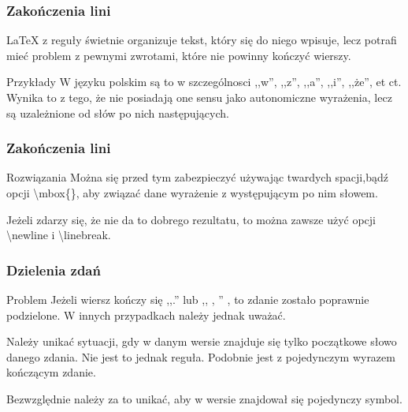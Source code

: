 \documentclass{beamer}
\begin{document}
\begin{frame}
\frametitle{Zakończenia lini}


\begin{block}{}
\LaTeX{ } z reguły świetnie organizuje tekst, który się do niego wpisuje, lecz
potrafi mieć problem z pewnymi zwrotami, które nie powinny kończyć wierszy.

\end{block}
\pause

\begin{block}{Przykłady}
W języku polskim są to w szczególnosci ,,w'', ,,z'', ,,a'', ,,i'', ,,że'', \linebreak et ct. Wynika to z tego, że nie posiadają one sensu jako autonomiczne wyrażenia, lecz są uzależnione od słów po nich następujących.
\end{block}


\end{frame}



\begin{frame}
\frametitle{Zakończenia lini}
\pause

\begin{block}{Rozwiązania}
Można się przed tym zabezpieczyć używając twardych spacji,\linebreak bądź opcji \textbackslash mbox\{\}, aby związać dane wyrażenie z występującym po nim słowem.
\end{block}
\pause

\begin{block}{}
Jeżeli zdarzy się, że nie da to dobrego rezultatu, to można zawsze użyć opcji \textbackslash newline i \textbackslash linebreak.
\end{block}


\end{frame}



\begin{frame}
\frametitle{Dzielenia zdań}
\pause

\begin{block}{Problem}
Jeżeli wiersz kończy się ,,.'' lub ,, , '' , to zdanie zostało poprawnie podzielone. W innych przypadkach należy jednak uważać.
\end{block}
\pause

\begin{block}{}
Należy unikać sytuacji, gdy w danym wersie znajduje się tylko początkowe słowo danego zdania. Nie jest to jednak reguła.
\pause
Podobnie jest z pojedynczym wyrazem kończącym zdanie.
\end{block}
\pause

\begin{block}{}
Bezwzględnie należy za to unikać, aby w wersie znajdował się pojedynczy symbol.
\end{block}


\end{frame}
\end{document}
